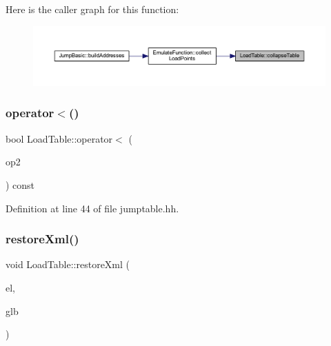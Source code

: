 Here is the caller graph for this function\+:
\nopagebreak
\begin{figure}[H]
\begin{center}
\leavevmode
\includegraphics[width=350pt]{class_load_table_a97a6c0e7bdf847535b4117aff4e49ede_icgraph}
\end{center}
\end{figure}
\mbox{\label{class_load_table_a857a77b6381435b9cbff1cb080c9ae6d}} 
\subsubsection{\texorpdfstring{operator$<$()}{operator<()}}
{\footnotesize\ttfamily bool Load\+Table\+::operator$<$ (\begin{DoxyParamCaption}\item[{const \mbox{\hyperlink{class_load_table}{Load\+Table}} \&}]{op2 }\end{DoxyParamCaption}) const\hspace{0.3cm}{\ttfamily [inline]}}



Definition at line 44 of file jumptable.\+hh.

\mbox{\label{class_load_table_a4db003d9f9ded3dce940fa9644b5874d}} 
\subsubsection{\texorpdfstring{restoreXml()}{restoreXml()}}
{\footnotesize\ttfamily void Load\+Table\+::restore\+Xml (\begin{DoxyParamCaption}\item[{const \mbox{\hyperlink{class_element}{Element}} $\ast$}]{el,  }\item[{\mbox{\hyperlink{class_architecture}{Architecture}} $\ast$}]{glb }\end{DoxyParamCaption})}



